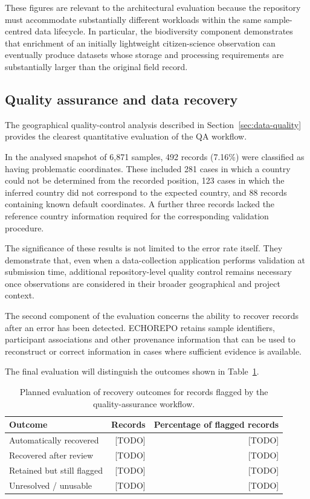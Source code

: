 These figures are relevant to the architectural evaluation because the
repository must accommodate substantially different workloads within the
same sample-centred data lifecycle. In particular, the biodiversity
component demonstrates that enrichment of an initially lightweight
citizen-science observation can eventually produce datasets whose
storage and processing requirements are substantially larger than
the original field record.

\subsection{Quality assurance and data recovery}

The geographical quality-control analysis described in
Section~\ref{sec:data-quality} provides the clearest quantitative
evaluation of the QA workflow.

In the analysed snapshot of 6,871 samples, 492 records (7.16\%) were
classified as having problematic coordinates. These included 281 cases
in which a country could not be determined from the recorded position,
123 cases in which the inferred country did not correspond to the
expected country, and 88 records containing known default coordinates.
A further three records lacked the reference country information required
for the corresponding validation procedure.

The significance of these results is not limited to the error rate itself.
They demonstrate that, even when a data-collection application performs
validation at submission time, additional repository-level quality
control remains necessary once observations are considered in their
broader geographical and project context.

The second component of the evaluation concerns the ability to recover
records after an error has been detected. ECHOREPO retains sample
identifiers, participant associations and other provenance information
that can be used to reconstruct or correct information in cases where
sufficient evidence is available.

The final evaluation will distinguish the outcomes shown in
Table~\ref{tab:recovery-results}.

\begin{table}[htbp]
    \centering
    \caption{Planned evaluation of recovery outcomes for records flagged
    by the quality-assurance workflow.}
    \label{tab:recovery-results}
    \begin{tabular}{lrr}
        \toprule
        Outcome & Records & Percentage of flagged records \\
        \midrule
        Automatically recovered & [TODO] & [TODO] \\
        Recovered after review & [TODO] & [TODO] \\
        Retained but still flagged & [TODO] & [TODO] \\
        Unresolved / unusable & [TODO] & [TODO] \\
        \bottomrule
    \end{tabular}
\end{table}

